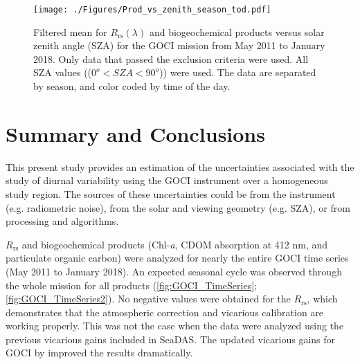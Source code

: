 \documentclass[remotesensing,article,submit,moreauthors,pdftex,10pt,a4paper]{Definitions/mdpi}
\begin{document}
\begin{figure}[htbp!]
  \texttt{[image: ./Figures/Prod\_vs\_zenith\_season\_tod.pdf]}
  \caption{Filtered mean for $R_\text{rs}(\lambda)$ and biogeochemical products versus solar zenith angle (SZA) for the GOCI mission from May 2011 to January 2018. Only data that passed the exclusion criteria were used. All SZA values (($0^o<SZA<90^o$)) were used. The data are separated by season, and color coded by time of the day. \label{fig:Prod_vs_zenith_season_tod} } 
\end{figure}

\section{Summary and Conclusions} 





This present study provides an estimation of the uncertainties associated with the study of diurnal variability using the GOCI instrument over a homogeneous study region. The sources of these uncertainties could be from the instrument (e.g. radiometric noise), from the solar and viewing geometry (e.g. SZA), or from processing and algorithms. 

$R_\text{rs}$ and biogeochemical products (Chl-{\it a}, CDOM absorption at 412 nm, and particulate organic carbon) were analyzed for nearly the entire GOCI time series (May 2011 to January 2018). An expected seasonal cycle was observed through the whole mission for all products (\autoref{fig:GOCI_TimeSeries}; \autoref{fig:GOCI_TimeSeries2}). No negative values were obtained for the $R_\text{rs}$, which demonstrates that the atmospheric correction and vicarious calibration are working properly. This was not the case when the data were analyzed using the previous vicarious gains included in SeaDAS. The updated vicarious gains for GOCI by \cite{Concha_2018a} improved the results dramatically.
\end{document}
